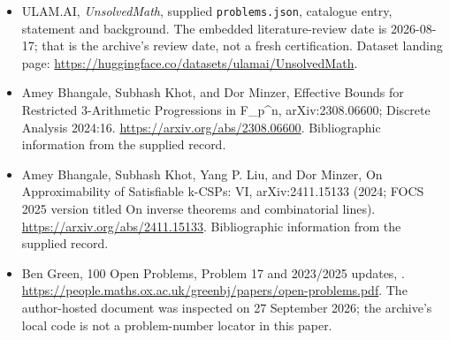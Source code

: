 \documentclass[11pt,a4paper]{article}
\begin{document}
{\small

\begin{itemize}

\item[\hypertarget{source:statement:1}{S1}] ULAM.AI, \emph{UnsolvedMath}, supplied \texttt{problems.json}, catalogue entry, statement and background. The embedded literature-review date is 2026-08-17; that is the archive’s review date, not a fresh certification. Dataset landing page: \url{https://huggingface.co/datasets/ulamai/UnsolvedMath}.

\item[\hypertarget{source:statement:2}{S2}] Amey Bhangale, Subhash Khot, and Dor Minzer, Effective Bounds for Restricted 3-Arithmetic Progressions in F\_p\textasciicircum{}n, arXiv:2308.06600; Discrete Analysis 2024:16. \url{https://arxiv.org/abs/2308.06600}. Bibliographic information from the supplied record.

\item[\hypertarget{source:statement:3}{S3}] Amey Bhangale, Subhash Khot, Yang P. Liu, and Dor Minzer, On Approximability of Satisfiable k-CSPs: VI, arXiv:2411.15133 (2024; FOCS 2025 version titled On inverse theorems and combinatorial lines). \url{https://arxiv.org/abs/2411.15133}. Bibliographic information from the supplied record.

\item[\hypertarget{source:statement:4}{S4}] Ben Green, 100 Open Problems, Problem 17 and 2023/2025 updates, . \url{https://people.maths.ox.ac.uk/greenbj/papers/open-problems.pdf}. The author-hosted document was inspected on 27 September 2026; the archive’s local code is not a problem-number locator in this paper.

\end{itemize}

}

\label{end:statement}
\end{document}
